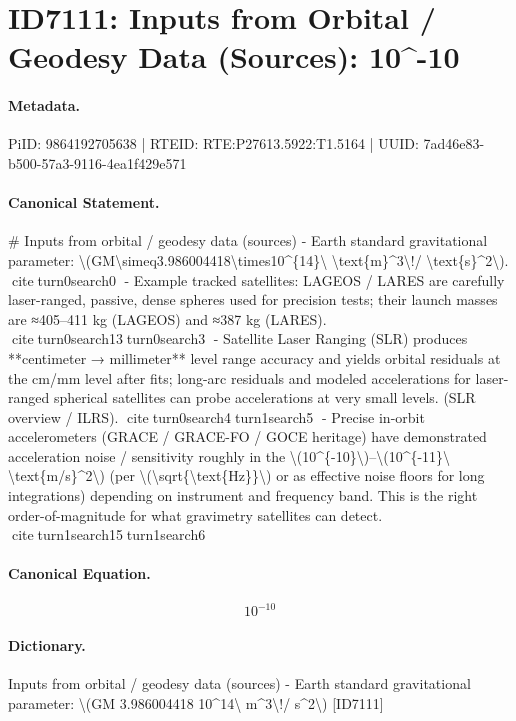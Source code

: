 \section*{ID7111: Inputs from Orbital / Geodesy Data (Sources): 10\textasciicircum{}-10}
\paragraph{Metadata.}
PiID: 9864192705638 | RTEID: RTE:P27613.5922:T1.5164 | UUID: 7ad46e83-b500-57a3-9116-4ea1f429e571

\paragraph{Canonical Statement.}
\# Inputs from orbital / geodesy data (sources) - Earth standard gravitational parameter: \textbackslash{}(GM\textbackslash{}simeq3.986004418\textbackslash{}times10\textasciicircum{}\{14\}\textbackslash{} \textbackslash{}text\{m\}\textasciicircum{}3\textbackslash{}!/ \textbackslash{}text\{s\}\textasciicircum{}2\textbackslash{}). citeturn0search0 - Example tracked satellites: LAGEOS / LARES are carefully laser-ranged, passive, dense spheres used for precision tests; their launch masses are ≈405–411 kg (LAGEOS) and ≈387 kg (LARES). citeturn0search13turn0search3 - Satellite Laser Ranging (SLR) produces **centimeter → millimeter** level range accuracy and yields orbital residuals at the cm/mm level after fits; long-arc residuals and modeled accelerations for laser-ranged spherical satellites can probe accelerations at very small levels. (SLR overview / ILRS). citeturn0search4turn1search5 - Precise in-orbit accelerometers (GRACE / GRACE-FO / GOCE heritage) have demonstrated acceleration noise / sensitivity roughly in the \textbackslash{}(10\textasciicircum{}\{-10\}\textbackslash{})–\textbackslash{}(10\textasciicircum{}\{-11\}\textbackslash{} \textbackslash{}text\{m/s\}\textasciicircum{}2\textbackslash{}) (per \textbackslash{}(\textbackslash{}sqrt\{\textbackslash{}text\{Hz\}\}\textbackslash{}) or as effective noise floors for long integrations) depending on instrument and frequency band. This is the right order-of-magnitude for what gravimetry satellites can detect. citeturn1search15turn1search6

\paragraph{Canonical Equation.}
\[
10^{-10}
\]

\paragraph{Dictionary.}
Inputs from orbital / geodesy data (sources) - Earth standard gravitational parameter: \textbackslash{}(GM 3.986004418 10\textasciicircum{}14\textbackslash{} m\textasciicircum{}3\textbackslash{}!/ s\textasciicircum{}2\textbackslash{}) [ID7111]

